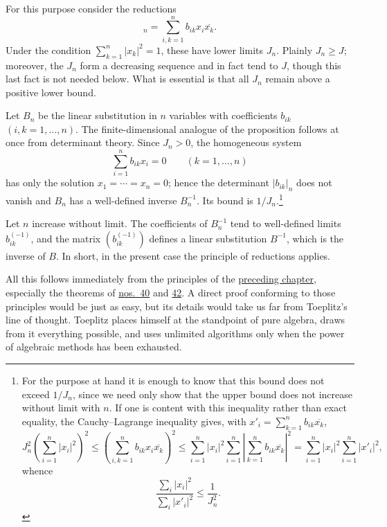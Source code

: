 \documentclass[
  paper=b5,
  fontsize=13pt,
  twoside=true,
  open=any,
  bookmarkpackage=false,
  chapterprefix=true,
  headings=normal
]{scrbook}
\theoremstyle{definition}
\begin{document}
For this purpose consider the reductions
\begin{equation}
  [B(x,\overline{x})]_n
  =\sum_{i,k=1}^{n}b_{ik}x_i\overline{x_k}.
  \tag{20}\label{eq:62:20}
\end{equation}
Under the condition $\sum_{k=1}^{n}|x_k|^2=1$, these have lower limits
$J_n$. Plainly $J_n\geq J$; moreover, the $J_n$ form a decreasing sequence
and in fact tend to $J$, though this last fact is not needed below. What is
essential is that all $J_n$ remain above a positive lower bound.

Let $B_n$ be the linear substitution in $n$ variables with coefficients
$b_{ik}$ $(i,k=1,\ldots,n)$. The finite-dimensional analogue of the
proposition follows at once from determinant theory. Since $J_n>0$, the
homogeneous system
\[
  \sum_{i=1}^{n}b_{ik}x_i=0
  \qquad(k=1,\ldots,n)
\]
has only the solution $x_1=\cdots=x_n=0$; hence the determinant
$|b_{ik}|_n$ does not vanish and $B_n$ has a well-defined inverse
$B_n^{-1}$. Its bound is $1/J_n$.\footnote{For the purpose at hand it is
enough to know that this bound does not exceed $1/J_n$, since we need only
show that the upper bound does not increase without limit with $n$. If one
is content with this inequality rather than exact equality, the
 Cauchy--Lagrange inequality gives, with
 $x'_i=\sum_{k=1}^{n}b_{ik}\overline{x_k}$,
\[
 J_n^2\left(\sum_{i=1}^{n}|x_i|^2\right)^2
 \leq\left(\sum_{i,k=1}^{n}b_{ik}x_i\overline{x_k}\right)^2
 \leq\sum_{i=1}^{n}|x_i|^2
      \sum_{i=1}^{n}\left|\sum_{k=1}^{n}b_{ik}\overline{x_k}\right|^2
 =\sum_{i=1}^{n}|x_i|^2\sum_{i=1}^{n}|x'_i|^2,
\]
whence
\[
 \frac{\sum_i|x_i|^2}{\sum_i|x'_i|^2}\leq\frac1{J_n^2}.
\]}

Let $n$ increase without limit. The coefficients of $B_n^{-1}$ tend to
well-defined limits $b_{ik}^{(-1)}$, and the matrix
$(b_{ik}^{(-1)})$ defines a linear substitution $B^{-1}$, which is the
inverse of $B$. In short, in the present case the principle of reductions
applies.

All this follows immediately from the principles of the \hyperref[chap:3]{preceding chapter},
especially the theorems of \hyperref[sec:40]{nos.~40} and
\hyperref[sec:42]{42}. A direct proof conforming to those principles would
be just as easy, but its details would take us far from Toeplitz's line of
thought. Toeplitz places himself at the standpoint of pure algebra, draws
from it everything possible, and uses unlimited algorithms only when the
power of algebraic methods has been exhausted.
\end{document}
